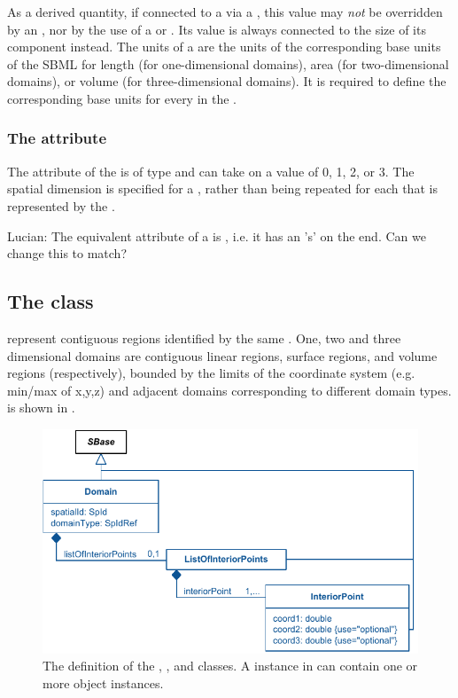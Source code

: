 As a derived quantity, if connected to a \Parameter via a \SpatialSymbolReference, this value may \emph{not} be overridden by an \InitialAssignment, nor by the use of a \Rule or \Event.  Its value is always connected to the size of its component \Domains instead.  The units of a \DomainType are the units of the corresponding base units of the SBML \Model for length (for one-dimensional domains), area (for two-dimensional domains), or volume (for three-dimensional domains).  It is required to define the corresponding base units for every \DomainType in the \Model.

\subsubsection{The  attribute}
The  attribute of the \DomainType is of type  and can take on a value of 0, 1, 2, or 3. The spatial dimension is specified for a \DomainType, rather than being repeated for each \Domain that is represented by the \DomainType.

{\color{red} Lucian: \notice The equivalent attribute of a \Compartment is , i.e. it has an 's' on the end.  Can we change this to match?}


\subsection{The  class}
\label{Domain-class}
\label{ListOfInteriorPoints-class}
\Domains represent contiguous regions identified by the same \DomainType.  One, two and three dimensional domains are contiguous linear regions, surface regions, and volume regions (respectively), bounded by the limits of the coordinate system (e.g. min/max of x,y,z) and adjacent domains corresponding to different domain types.  \Domain is shown in .
 
\begin{figure}[ht]
  \includegraphics{figs/Domain-uml}
  \caption{The definition of the \Domain, \ListOfInteriorPoints, and \InteriorPoint classes.  A \ListOfDomains instance in \Geometry can contain one or more \Domain object instances.}
  \label{Domain-uml}
  \label{InteriorPoint-uml}
  \label{ListOfInteriorPoints-uml}
\end{figure}

